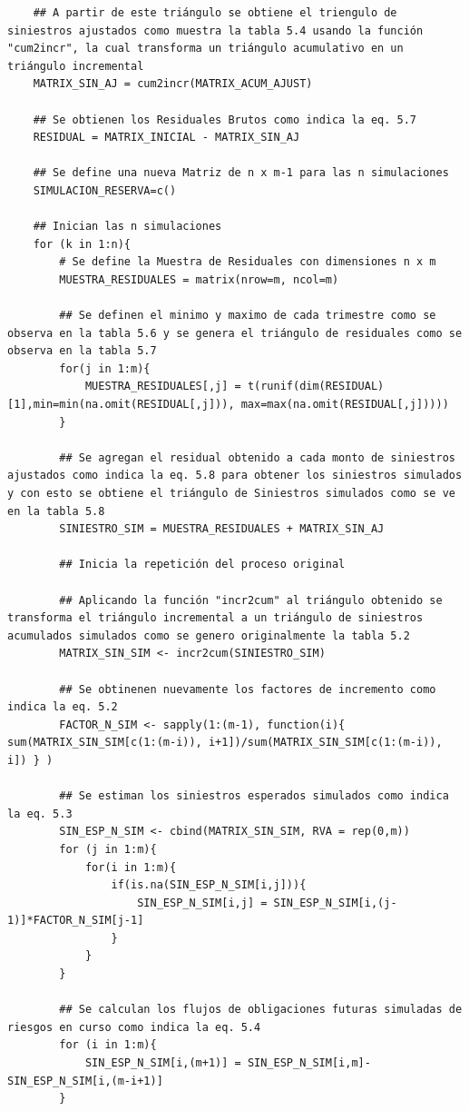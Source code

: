 \documentclass[11pt,twoside,openright,spanish]{report}
\numberwithin{equation}{chapter}
\numberwithin{figure}{chapter}
\numberwithin{table}{chapter}
\begin{document}
\begin{lstlisting}
	## A partir de este triángulo se obtiene el triengulo de siniestros ajustados como muestra la tabla 5.4 usando la función "cum2incr", la cual transforma un triángulo acumulativo en un triángulo incremental
	MATRIX_SIN_AJ = cum2incr(MATRIX_ACUM_AJUST)
	
	## Se obtienen los Residuales Brutos como indica la eq. 5.7
	RESIDUAL = MATRIX_INICIAL - MATRIX_SIN_AJ
	
	## Se define una nueva Matriz de n x m-1 para las n simulaciones
	SIMULACION_RESERVA=c()
	
	## Inician las n simulaciones
	for (k in 1:n){
		# Se define la Muestra de Residuales con dimensiones n x m
		MUESTRA_RESIDUALES = matrix(nrow=m, ncol=m)
		
		## Se definen el minimo y maximo de cada trimestre como se observa en la tabla 5.6 y se genera el triángulo de residuales como se observa en la tabla 5.7
		for(j in 1:m){
			MUESTRA_RESIDUALES[,j] = t(runif(dim(RESIDUAL)[1],min=min(na.omit(RESIDUAL[,j])), max=max(na.omit(RESIDUAL[,j]))))
		}
		
		## Se agregan el residual obtenido a cada monto de siniestros ajustados como indica la eq. 5.8 para obtener los siniestros simulados y con esto se obtiene el triángulo de Siniestros simulados como se ve en la tabla 5.8		
		SINIESTRO_SIM = MUESTRA_RESIDUALES + MATRIX_SIN_AJ
		
		## Inicia la repetición del proceso original
		
		## Aplicando la función "incr2cum" al triángulo obtenido se transforma el triángulo incremental a un triángulo de siniestros acumulados simulados como se genero originalmente la tabla 5.2
		MATRIX_SIN_SIM <- incr2cum(SINIESTRO_SIM)
		
		## Se obtinenen nuevamente los factores de incremento como indica la eq. 5.2
		FACTOR_N_SIM <- sapply(1:(m-1), function(i){ sum(MATRIX_SIN_SIM[c(1:(m-i)), i+1])/sum(MATRIX_SIN_SIM[c(1:(m-i)), i]) } )
		
		## Se estiman los siniestros esperados simulados como indica la eq. 5.3
		SIN_ESP_N_SIM <- cbind(MATRIX_SIN_SIM, RVA = rep(0,m))
		for (j in 1:m){
			for(i in 1:m){
				if(is.na(SIN_ESP_N_SIM[i,j])){
					SIN_ESP_N_SIM[i,j] = SIN_ESP_N_SIM[i,(j-1)]*FACTOR_N_SIM[j-1]
				}
			}
		}
		
		## Se calculan los flujos de obligaciones futuras simuladas de riesgos en curso como indica la eq. 5.4
		for (i in 1:m){
			SIN_ESP_N_SIM[i,(m+1)] = SIN_ESP_N_SIM[i,m]-SIN_ESP_N_SIM[i,(m-i+1)]
		}
		

\end{lstlisting}
\end{document}
